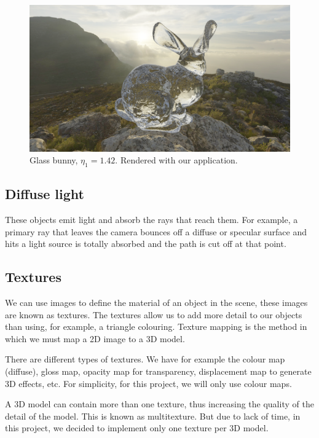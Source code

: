 \documentclass[titlepage,12pt]{report}
\begin{document}
\begin{figure}[H]
	\centering
	\includegraphics[scale=0.65]{media/CapeHill_cristal_bunny.png}
	\caption{Glass bunny, $\eta_1 = 1.42$. Rendered with our application.}
	\label{dielectric1}
\end{figure}

\subsection{Diffuse light}

These objects emit light and absorb the rays that reach them. For example, a primary ray that leaves the camera bounces off a diffuse or specular surface and hits a light source is totally absorbed and the path is cut off at that point.

\subsection{Textures}

We can use images to define the material of an object in the scene, these images are known as textures. The textures allow us to add more detail to our objects than using, for example, a triangle colouring. Texture mapping is the method in which we must map a 2D image to a 3D model.

There are different types of textures. We have for example the colour map (diffuse), gloss map, opacity map for transparency, displacement map to generate 3D effects, etc. For simplicity, for this project, we will only use colour maps.

A 3D model can contain more than one texture, thus increasing the quality of the detail of the model. This is known as multitexture. But due to lack of time, in this project, we decided to implement only one texture per 3D model.
\end{document}
